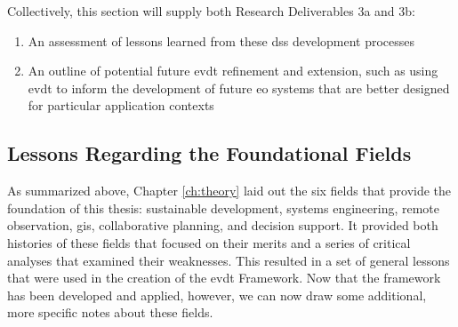 Collectively, this section will supply both Research Deliverables 3a and 3b:

\begin{enumerate}[label=\emph{\alph*},itemsep=0pt,parsep=0pt]
	\item{An assessment of lessons learned from these \ac{dss} development processes} 
	\item{An outline of potential future \ac{evdt} refinement and extension, such as using \ac{evdt} to inform the development of future \ac{eo} systems that are better designed for particular application contexts} 
\end{enumerate}





\subsection{Lessons Regarding the Foundational Fields} \label{sec:lessons-foundational}

As summarized above, Chapter \ref{ch:theory} laid out the six fields that provide the foundation of this thesis: sustainable development, systems engineering, remote observation, \ac{gis}, collaborative planning, and decision support. It provided both histories of these fields that focused on their merits and a series of critical analyses that examined their weaknesses. This resulted in a set of general lessons that were used in the creation of the \ac{evdt} Framework. Now that the framework has been developed and applied, however, we can now draw some additional, more specific notes about these fields.   

